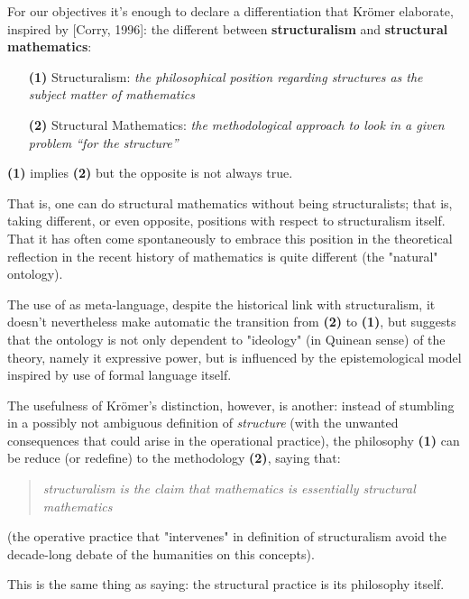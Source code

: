 For our objectives it's enough to declare a differentiation that Kr\"omer elaborate, inspired by [Corry, 1996]: the different between \textbf{structuralism} and \textbf{structural mathematics}:

\begin{itemize}
	\item[\textbf{(1)}] Structuralism: \textit{the philosophical
		      position regarding structures as the subject matter of mathematics}
	\item[\textbf{(2)}] Structural Mathematics: \textit{the methodological approach to look in a given problem
		      “for the structure”}
\end{itemize}
\begin{remark}
	\textbf{(1)} implies \textbf{(2)} but the opposite is not always true.

	That is, one can do structural mathematics without being structuralists; that is, taking different, or even opposite, positions with respect to structuralism itself. That it has often come spontaneously to embrace this position in the theoretical reflection in the recent history of mathematics is quite different (the "natural" ontology).

	The use of  as meta-language, despite the historical link with structuralism, it doesn't nevertheless make automatic the transition from \textbf{(2)} to \textbf{(1)}, but suggests that the ontology is not only dependent to "ideology" (in Quinean sense) of the theory, namely it expressive power, but is influenced by the epistemological model inspired by use of formal language itself.

\end{remark}

The usefulness of Kr\"omer's distinction, however, is another: instead of stumbling in a possibly not ambiguous definition of \textit{structure} (with the unwanted consequences that could arise in the operational practice), the philosophy \textbf{(1)} can be reduce (or redefine) to the methodology \textbf{(2)}, saying that:

\begin{quote}
	\emph{structuralism is the claim that mathematics
		is essentially structural mathematics} \cite{kromer2007tool}
\end{quote}

(the operative practice that "intervenes" in definition of structuralism avoid the decade-long debate of the humanities on this concepts).


This is the same thing as saying: the structural practice is its philosophy itself.

